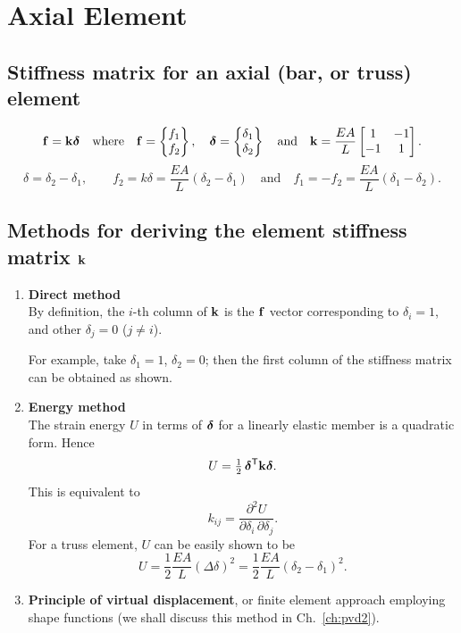 \chapter{Axial Element}

\section{Stiffness matrix for an axial (bar, or truss) element}
\begin{fig}
  
\end{fig}
\begin{equation}
  \mathbf{f} = \mathbf{k}\bm{\delta} \quad\text{where}\quad
  \mathbf{f} = \begin{Bmatrix}f_1\\ f_2\end{Bmatrix},\quad \bm{\delta} = \begin{Bmatrix}\delta_1\\ \delta_2\end{Bmatrix}
  \quad\text{and}\quad \mathbf{k} = \frac{EA}{L}\begin{bmatrix}1 & -1\\ -1 & 1\end{bmatrix}.
\end{equation}
\begin{equation*}
  \delta = \delta_2-\delta_1,\qquad f_2 = k\delta = \frac{EA}{L}(\delta_2-\delta_1)
  \quad\text{and}\quad f_1 = -f_2 = \frac{EA}{L}(\delta_1-\delta_2).
\end{equation*}

\section{Methods for deriving the element stiffness matrix \texorpdfstring{$\mathbf{k}$}{k}}
\begin{enumerate}[leftmargin=*]
  \item \textbf{Direct method}\\
    By definition, the $i$-th column of $\mathbf{k}$ is the $\mathbf{f}$ vector corresponding to $\delta_i = 1$, and other $\delta_j = 0$ ($j\neq i$).

    For example, take $\delta_1 = 1$, $\delta_2 = 0$; then the first column of the stiffness matrix can be obtained as shown.
    \begin{fig}
      
    \end{fig}
  \item \textbf{Energy method}\\
    The strain energy $U$ in terms of $\bm{\delta}$ for a linearly elastic member is a quadratic form. Hence
    \begin{equation}
      U = \tfrac12\,\bm{\delta}^{\mathsf{T}}\mathbf{k}\bm{\delta}.
    \end{equation}
    This is equivalent to
    \begin{equation}
      k_{ij} = \frac{\partial^2 U}{\partial\delta_i\,\partial\delta_j}.
    \end{equation}
    For a truss element, $U$ can be easily shown to be
    \begin{equation}
      U = \frac12\frac{EA}{L}(\Delta\delta)^2 = \frac12\frac{EA}{L}(\delta_2-\delta_1)^2.
    \end{equation}
  \item \textbf{Principle of virtual displacement}, or finite element approach employing shape functions (we shall discuss this method in Ch.~\ref{ch:pvd2}).
\end{enumerate}

